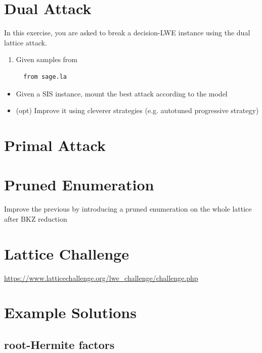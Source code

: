 \documentclass[10pt,a4paper,nobib]{tufte-handout}
\begin{document}
\section{Dual Attack}
\label{sec:org17c835d}

In this exercise, you are asked to break a decision-LWE instance using the dual lattice attack.

\begin{enumerate}
\item Given samples from 

\lstset{language=sage,label= ,caption= ,captionpos=b,numbers=none}
\begin{lstlisting}
  from sage.la
\end{lstlisting}
\end{enumerate}


\begin{itemize}
\item Given a SIS instance, mount the best attack according to the model

\item (opt) Improve it using cleverer strategies (e.g. autotuned progressive strategy)
\end{itemize}

\section{Primal Attack}
\label{sec:org4a41468}

\section{Pruned Enumeration}
\label{sec:orgc7ca936}

Improve the previous by introducing a pruned enumeration on the whole lattice after BKZ reduction

\section{Lattice Challenge}
\label{sec:org083500d}

\url{https://www.latticechallenge.org/lwe\_challenge/challenge.php}

\appendix

\section{Example Solutions}
\label{sec:org00ca19b}

\subsection{root-Hermite factors}
\label{sec:orgd98b0a0}
\end{document}
